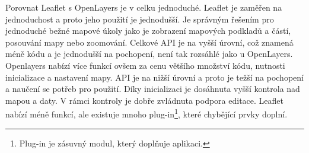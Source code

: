 \documentclass[12pt]{article}%
\begin{document}
{{
Porovnat Leaflet s OpenLayers je v celku jednoduché. Leaflet je zaměřen na jednoduchost a proto 
jeho použití je jednodušší. Je správným řešením pro jednoduché bežné mapové úkoly jako je zobrazení 
mapových podkladů a částí, posouvání mapy nebo zoomování. Celkové API je na vyšší úrovní, což 
znamená méně kódu a je jednodušší na pochopení, není tak rozsáhlé jako u OpenLayers. Openlayers 
nabízí více funkcí ovšem za cenu většího množství kódu, nutnosti inicializace a nastavení mapy. 
API je na nižší úrovní a proto je težší na pochopení a naučení se potřeb pro použití.
Díky inicializaci je dosáhnuta vyšší kontrola nad mapou a daty. V rámci kontroly je dobře zvládnuta 
podpora editace. Leaflet nabízí méně funkcí, ale existuje mnoho plug-in\footnote{Plug-in je 
zásuvný modul, který doplňuje aplikaci.}, které chybějící prvky doplní.


}}
\end{document}
